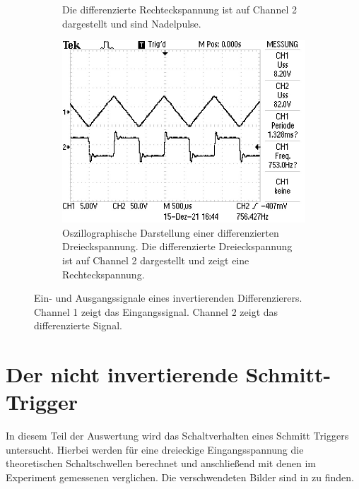 \begin{figure}
\begin{subfigure}[b]{0.45\textwidth}
{        Die differenzierte Rechteckspannung ist auf Channel 2 dargestellt und sind Nadelpulse.}
        \label{fig:diff_recht}
    \end{subfigure}
    \newline
    \newline  
    \newline
    \newline  
    \newline  
    \begin{subfigure}{0.45\textwidth}
        \centering
        \includegraphics[width=\textwidth]{data_of_others_cuz_ours_suck/diff/diff dreieck.JPG}
        \caption{Oszillographische Darstellung einer differenzierten Dreieckspannung.
        Die differenzierte Dreieckspannung ist auf Channel 2 dargestellt und zeigt eine Rechteckspannung.}
        \label{fig:diff_drei}
    \end{subfigure}
       \caption{Ein- und Ausgangssignale eines invertierenden Differenzierers. Channel 1 zeigt
       das Eingangssignal. Channel 2 zeigt das differenzierte Signal.}
       \label{fig:diff}
\end{figure}
\FloatBarrier

\section{Der nicht invertierende Schmitt-Trigger \cite{schmitt}}
In diesem Teil der Auswertung wird das Schaltverhalten eines Schmitt Triggers untersucht.
Hierbei werden für eine dreieckige Eingangsspannung die theoretischen Schaltschwellen berechnet und 
anschließend mit denen im Experiment gemessenen verglichen.
Die verschwendeten Bilder sind in \cite{schmitt} zu finden.

